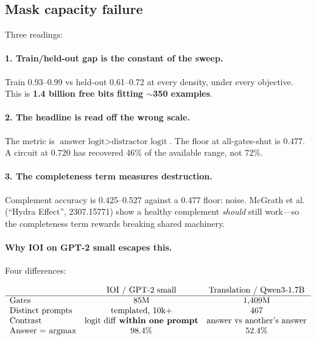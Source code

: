 \documentclass[11pt,a4paper]{article}
\begin{document}
\subsection{Mask capacity failure}\label{sec:capacity}

Three readings:

\paragraph{1. Train/held-out gap is the constant of the sweep.}
Train 0.93--0.99 vs held-out 0.61--0.72 at every density, under every objective.
This is \textbf{1.4 billion free bits fitting $\sim$350 examples}.

\paragraph{2. The headline is read off the wrong scale.}
The metric is \(\text{answer logit} > \text{distractor logit}\). The floor at all-gates-shut
is 0.477. A circuit at 0.720 has recovered 46\% of the available range, not 72\%.

\paragraph{3. The completeness term measures destruction.}
Complement accuracy is 0.425--0.527 against a 0.477 floor: noise. McGrath et
al.~\cite{hydra} (``Hydra Effect'', 2307.15771) show a healthy complement \emph{should}
still work---so the completeness term rewards breaking shared machinery.

\paragraph{Why IOI on GPT-2 small escapes this.} Four differences:

\[
\begin{array}{lcc}
& \text{IOI / GPT-2 small} & \text{Translation / Qwen3-1.7B} \\ \hline
\text{Gates} & 85\text{M} & 1{,}409\text{M} \\
\text{Distinct prompts} & \text{templated, 10k+} & 467 \\
\text{Contrast} & \text{logit diff \textbf{within one prompt}} & \text{answer vs another's answer} \\
\text{Answer = argmax} & 98.4\% & 52.4\% \\
\end{array}
\]
\end{document}
